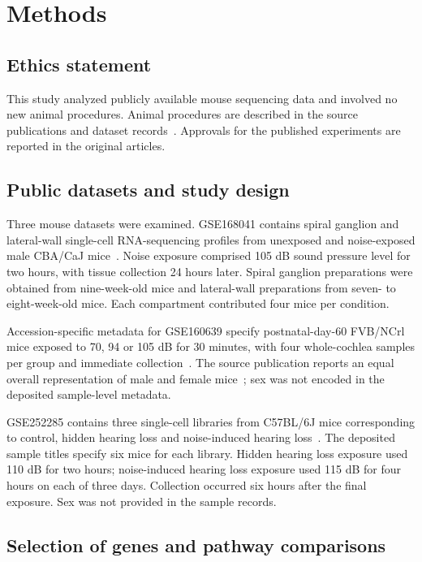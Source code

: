 \section{Methods}

\subsection{Ethics statement}

This study analyzed publicly available mouse sequencing data and involved no new animal procedures. Animal procedures are described in the source publications and dataset records~\citep{Milon2021,Jongkamonwiwat2020,GSE252285}. Approvals for the published experiments are reported in the original articles.

\subsection{Public datasets and study design}

Three mouse datasets were examined. GSE168041 contains spiral ganglion and lateral-wall single-cell RNA-sequencing profiles from unexposed and noise-exposed male CBA/\allowbreak{}CaJ mice~\citep{Milon2021}. Noise exposure comprised 105 dB sound pressure level for two hours, with tissue collection 24 hours later. Spiral ganglion preparations were obtained from nine-week-old mice and lateral-wall preparations from seven- to eight-week-old mice. Each compartment contributed four mice per condition.

Accession-specific metadata for GSE160639 specify postnatal-day-60 FVB/\allowbreak{}NCrl mice exposed to 70, 94 or 105 dB for 30 minutes, with four whole-cochlea samples per group and immediate collection~\citep{GSE160639}. The source publication reports an equal overall representation of male and female mice~\citep{Jongkamonwiwat2020}; sex was not encoded in the deposited sample-level metadata.

GSE252285 contains three single-cell libraries from C57BL/\allowbreak{}6J mice corresponding to control, hidden hearing loss and noise-induced hearing loss~\citep{GSE252285}. The deposited sample titles specify six mice for each library. Hidden hearing loss exposure used 110 dB for two hours; noise-induced hearing loss exposure used 115 dB for four hours on each of three days. Collection occurred six hours after the final exposure. Sex was not provided in the sample records.

\subsection{Selection of genes and pathway comparisons}


